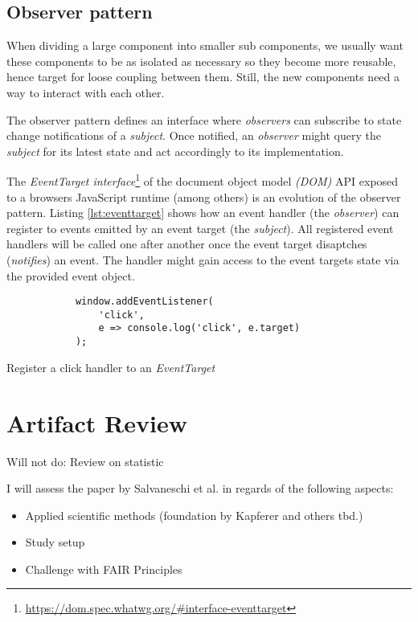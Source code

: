 \documentclass[11pt,a4paper,twocolumn]{article}
\begin{document}
	\subsection{Observer pattern}
	When dividing a large component into smaller sub components, we usually want these components to be as isolated as necessary so they become more reusable, hence target for loose coupling between them. Still, the new components need a way to interact with each other.

	The observer pattern \cite{gamma1995design} defines an interface where \emph{observers} can subscribe to state change notifications of a \emph{subject}. Once notified, an \emph{observer} might query the \emph{subject} for its latest state and act accordingly to its implementation.

	The \emph{EventTarget interface}\footnote{\url{https://dom.spec.whatwg.org/\#interface-eventtarget}} of the document object model \emph{(DOM)} API exposed to a browsers JavaScript runtime (among others) is an evolution of the observer pattern. Listing \ref{lst:eventtarget} shows how an event handler (the \emph{observer}) can register to events emitted by an event target (the \emph{subject}). All registered event handlers will be called one after another once the event target disaptches (\emph{notifies}) an event. The handler might gain access to the event targets state via the provided event object.

	\begin{listing}[H]
		\begin{verbatim}
			window.addEventListener(
				'click',
				e => console.log('click', e.target)
			);
		\end{verbatim}
		\caption{Register a click handler to an \emph{EventTarget}}
		\label{lst:eventtarget}
	\end{listing}


	\section{Artifact Review}
	Will not do: Review on statistic

	I will assess the paper by Salvaneschi et al. \cite{7827078} in regards of the following aspects:
	\begin{itemize}
		\item Applied scientific methods (foundation by Kapferer \cite{kapferer:2019:empirical} and others tbd.)
		\item Study setup
		\item Challenge with FAIR Principles \cite{2019arXiv190805986H} \cite{wilkinson:2016}
	\end{itemize}
\end{document}
